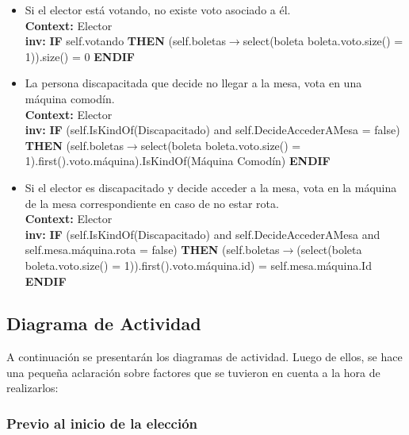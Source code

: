 \documentclass[spanish, 10pt,a4paper]{article}
\numberwithin{equation}{section} %
\begin{document}
\begin{itemize}
	\item Si el elector está votando, no existe voto asociado a él.
\\	\textbf{Context: }  Elector
\\	\textbf{inv: } \textbf{IF} self.votando \textbf{THEN} (self.boletas$\rightarrow$select(boleta \textbar boleta.voto.size() = 1)).size() = 0 \textbf{ENDIF}

	\item La persona discapacitada que decide no llegar a la mesa, vota en una máquina comodín.
\\	\textbf{Context: }  Elector
\\	\textbf{inv: } \textbf{IF} (self.IsKindOf(Discapacitado) and self.DecideAccederAMesa = false) \textbf{THEN} (self.boletas$\rightarrow$select(boleta \textbar boleta.voto.size() = 1).first().voto.máquina).IsKindOf(Máquina Comodín) \textbf{ENDIF}

	\item Si el elector es discapacitado y decide acceder a la mesa, vota en la máquina de la mesa correspondiente en caso de no estar rota.
\\	\textbf{Context: }  Elector
\\	\textbf{inv: } \textbf{IF} (self.IsKindOf(Discapacitado) and self.DecideAccederAMesa and self.mesa.máquina.rota = false) \textbf{THEN} (self.boletas$\rightarrow$(select(boleta \textbar boleta.voto.size() = 1)).first().voto.máquina.id) = self.mesa.máquina.Id \textbf{ENDIF}

\end{itemize}


\clearpage
\subsection{Diagrama de Actividad}
A continuación se presentarán los diagramas de actividad. Luego de ellos, se hace una pequeña aclaración sobre factores que se tuvieron en cuenta a la hora de realizarlos:

\subsubsection{Previo al inicio de la elección}
\end{document}
